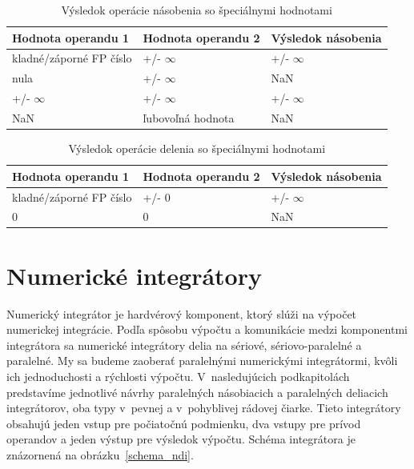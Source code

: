\begin{table}[h]
\centering
\begin{tabular}{|l|l|l|}
\hline
\rowcolor[HTML]{C0C0C0} 
Hodnota operandu 1 & Hodnota operandu 2 & Výsledok násobenia \\ \hline
kladné/záporné FP číslo & +/- $ \infty $ & +/- $ \infty $ \\ \hline
nula           & +/- $ \infty $ & NaN \\ \hline
+/- $ \infty $ & +/- $ \infty $ & +/- $ \infty $ \\ \hline
NaN & ľubovoľná hodnota & NaN \\ \hline
\end{tabular}
\caption{Výsledok operácie násobenia so špeciálnymi hodnotami}
\label{special_nasobenie}
\end{table}

\begin{table}[h]
\centering
\begin{tabular}{|l|l|l|}
\hline
\rowcolor[HTML]{C0C0C0} 
Hodnota operandu 1 & Hodnota operandu 2 & Výsledok násobenia \\ \hline
kladné/záporné FP číslo & +/- 0 & +/- $ \infty $ \\ \hline
0 & 0 & NaN \\ \hline
\end{tabular}
\caption{Výsledok operácie delenia so špeciálnymi hodnotami}
\label{special_delenie}
\end{table}

\chapter{Numerické integrátory} \label{NUM_INTEGRATORY}
Numerický integrátor je hardvérový komponent, ktorý slúži na výpočet numerickej integrácie. Podľa spôsobu výpočtu a komunikácie medzi komponentmi integrátora sa numerické integrátory delia na sériové, sériovo-paralelné a paralelné. My sa budeme zaoberať paralelnými numerickými integrátormi, kvôli ich jednoduchosti a rýchlosti výpočtu. V~nasledujúcich podkapitolách predstavíme jednotlivé návrhy paralelných násobiacich a paralelných deliacich integrátorov, oba typy v~pevnej a v~pohyblivej rádovej čiarke. Tieto integrátory obsahujú jeden vstup pre počiatočnú podmienku, dva vstupy pre prívod operandov a jeden výstup pre výsledok výpočtu. Schéma integrátora je znázornená na obrázku~\ref{schema_ndi}.


